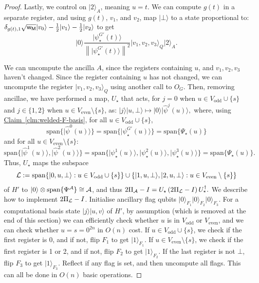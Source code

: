 \documentclass{article}
\newcommand{\clm}[1]{\hyperref[clm:#1]{Claim~\ref*{clm:#1}}}
\def\ket#1{{\lvert}#1\rangle}
\renewcommand{\>}{\rangle}
\newcommand{\<}{\langle}
\renewcommand{\(}{\left(}
\renewcommand{\)}{\right)}
\def\norm#1{\left\| #1 \right\|}
\def\w{{\sf w}}
\begin{document}
\begin{proof}
Lastly, we control on $\ket{2}_A$, meaning $u=t$. We can compute $g(t)$ in a separate register, and using $g(t)$, $v_1$, and $v_2$, map $\ket{\bot}$ to a state proportional to:
$\delta_{g(t),1}\sqrt{\w_{\sf M}}\ket{v_0}-\frac{1}{2}\ket{v_1}-\frac{1}{2}\ket{v_2}$
to get
$$\ket{0}\frac{\ket{{\psi}^{G'}_\star(t)}}{\norm{\ket{{\psi}^{G'}_\star(t)}}^2}\ket{v_1,v_2,v_3}_Q\ket{2}_A.$$

We can uncompute the ancilla $A$, since the registers containing $u$, and $v_1,v_2,v_3$ haven't changed.
Since the register containing $u$ has not changed, we can uncompute the register $\ket{v_1,v_2,v_3}_Q$ using another call to $O_G$. Then, removing ancillae, we have performed a map, $U_\star$ that acts, for $j=0$ when $u\in V_{\mathrm{odd}}\cup\{s\}$ and $j\in\{1,2\}$ when $u\in V_{\mathrm{even}}\setminus\{s\}$, as:
$\ket{j}\ket{u,\bot}\mapsto \ket{0}\ket{\widehat{\psi}^j(u)},$
where, using \clm{welded-F-basis}, for all $u\in V_{\mathrm{odd}}\cup\{s\}$,
$$\mathrm{span}\{\ket{\widehat{\psi}^0(u)}\}=\mathrm{span}\{\ket{\psi_\star^{G'}(u)}\}=\mathrm{span}\{\Psi_\star(u)\}$$
and for all $u\in V_{\mathrm{even}}\setminus \{s\}$:
$$\mathrm{span}\{\ket{\widehat{\psi}^1(u)},\ket{\widehat{\psi}^2(u)}\}=\mathrm{span}\{\ket{\psi_\star^1(u)},\ket{\psi_\star^2(u)},\ket{\psi_\star^3(u)}\}=\mathrm{span}\{\Psi_\star(u)\}.$$
Thus, $U_\star$ maps the subspace
$${\cal L}:=\mathrm{span}\{\ket{0,u,\bot}:u\in V_{\mathrm{odd}}\cup\{s\}\}\cup\{\ket{1,u,\bot},\ket{2,u,\bot}:u\in V_{\mathrm{even}}\setminus\{s\}\}$$
of $H'$ to $\ket{0}\otimes \mathrm{span}\{\Psi^{\cal A}\}\cong {\cal A}$, and thus 
$2\Pi_{\cal A}-I = U_\star \left(2\Pi_{\cal L}  -I\right) U_\star^\dagger.$
We describe how to implement $2\Pi_{\cal L}-I$. Initialise ancillary flag qubits $\ket{0}_{F_1}\ket{0}_{F_2}\ket{0}_{F_3}$. For a computational basis state $\ket{j}\ket{u,v}$ of $H'$, by assumption (which is removed at the end of this section) we can efficiently check whether $u$ is in $V_{\mathrm{odd}}$ or $V_{\mathrm{even}}$, and we can check whether $u=s=0^{2n}$ in $O(n)$ cost. If $u\in V_{\mathrm{odd}}\cup\{s\}$, we check if the first register is 0, and if not, flip $F_1$ to get $\ket{1}_{F_1}$. If $u\in V_{\mathrm{even}}\setminus \{s\}$, we check if the first register is 1 or 2, and if not, flip $F_2$ to get $\ket{1}_{F_2}$. If the last register is not $\bot$, flip $F_3$ to get $\ket{1}_{F_3}$. Reflect if any flag is set, and then uncompute all flags. This can all be done in $O(n)$ basic operations.


\end{proof}
\end{document}
